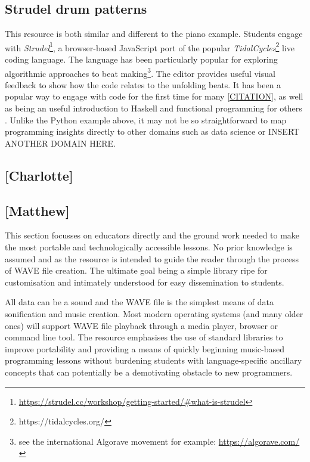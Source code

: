 \subsection{Strudel drum patterns}
This resource is both similar and different to the piano example. Students engage with \emph{Strudel}\footnote{\url{https://strudel.cc/workshop/getting-started/\#what-is-strudel}}, a browser-based JavaScript port of the popular \emph{TidalCycles}\footnote{https://tidalcycles.org/} live coding language. The language has been particularly popular for exploring algorithmic approaches to beat making\footnote{see the international Algorave movement for example: \url{https://algorave.com/}}. The editor provides useful visual feedback to show how the code relates to the unfolding beats. It has been a popular way to engage with code for the first time for many \ref{CITATION}, as well as being an useful introduction to Haskell and functional programming for others \cite{CITATION}. Unlike the Python example above, it may not be so straightforward to map programming insights directly to other domains such as data science or INSERT ANOTHER DOMAIN HERE.

\subsection{[Charlotte]}


\subsection{[Matthew]}
This section focusses on educators directly and the ground work needed to make the most portable and technologically accessible lessons. No prior knowledge is assumed and as the resource is intended to guide the reader through the process of WAVE file creation. The ultimate goal being a simple library ripe for customisation and intimately understood for easy dissemination to students.

All data can be a sound and the WAVE file is the simplest means of data sonification and music creation. Most modern operating systems (and many older ones) will support WAVE file playback through a media player, browser or command line tool. The resource emphasises the use of standard libraries to improve portability and providing a means of quickly beginning music-based programming lessons without burdening students with language-specific ancillary concepts that can potentially be a demotivating obstacle to new programmers.

